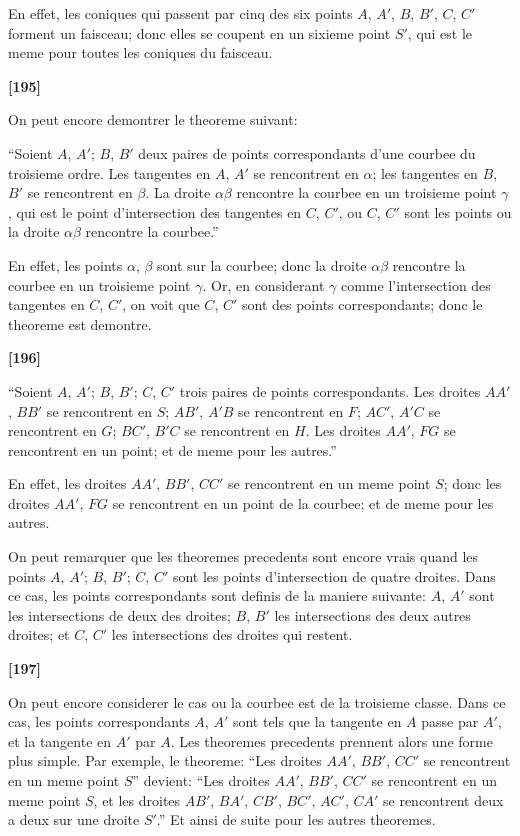 \documentclass[11pt,a4paper]{book}
\begin{document}
En effet, les coniques qui passent par cinq des six points $A$, $A'$, $B$, $B'$, $C$, $C'$ forment
un faisceau; donc elles se coupent en un sixieme point $S'$, qui est le meme pour toutes
les coniques du faisceau.

\textbf{[195]}

On peut encore demontrer le theoreme suivant:

``Soient $A$, $A'$; $B$, $B'$ deux paires de points correspondants d'une courbee du troisieme
ordre. Les tangentes en $A$, $A'$ se rencontrent en $\alpha$; les tangentes en $B$, $B'$ se rencontrent
en $\beta$. La droite $\alpha\beta$ rencontre la courbee en un troisieme point $\gamma$, qui est le point
 d'intersection des tangentes en $C$, $C'$, ou $C$, $C'$ sont les points ou la droite $\alpha\beta$ rencontre
la courbee.''

En effet, les points $\alpha$, $\beta$ sont sur la courbee; donc la droite $\alpha\beta$ rencontre la courbee
en un troisieme point $\gamma$. Or, en considerant $\gamma$ comme l'intersection des tangentes en $C$, $C'$,
on voit que $C$, $C'$ sont des points correspondants; donc le theoreme est demontre.

\textbf{[196]}

``Soient $A$, $A'$; $B$, $B'$; $C$, $C'$ trois paires de points correspondants. Les droites
$AA'$, $BB'$ se rencontrent en $S$; $AB'$, $A'B$ se rencontrent en $F$; $AC'$, $A'C$ se rencontrent
en $G$; $BC'$, $B'C$ se rencontrent en $H$. Les droites $AA'$, $FG$ se rencontrent en un point;
et de meme pour les autres.''

En effet, les droites $AA'$, $BB'$, $CC'$ se rencontrent en un meme point $S$; donc les
droites $AA'$, $FG$ se rencontrent en un point de la courbee; et de meme pour les autres.

On peut remarquer que les theoremes precedents sont encore vrais quand les points
$A$, $A'$; $B$, $B'$; $C$, $C'$ sont les points d'intersection de quatre droites. Dans ce cas, les
points correspondants sont definis de la maniere suivante: $A$, $A'$ sont les intersections
de deux des droites; $B$, $B'$ les intersections des deux autres droites; et $C$, $C'$ les
intersections des droites qui restent.

\textbf{[197]}

On peut encore considerer le cas ou la courbee est de la troisieme classe. Dans
ce cas, les points correspondants $A$, $A'$ sont tels que la tangente en $A$ passe par $A'$,
et la tangente en $A'$ par $A$. Les theoremes precedents prennent alors une forme plus
simple. Par exemple, le theoreme: ``Les droites $AA'$, $BB'$, $CC'$ se rencontrent en un
meme point $S$'' devient: ``Les droites $AA'$, $BB'$, $CC'$ se rencontrent en un meme point
$S$, et les droites $AB'$, $BA'$, $CB'$, $BC'$, $AC'$, $CA'$ se rencontrent deux a deux sur une
droite $S'$.'' Et ainsi de suite pour les autres theoremes.
\end{document}
